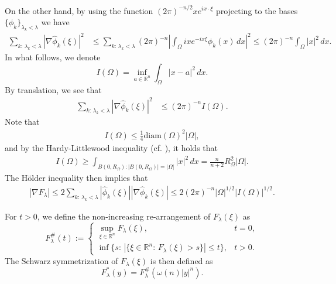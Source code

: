 \documentclass[11pt,twoside, leqno]{article}
\def\rr{{\mathbb R}}
\def\rn{{{\rr}^n}}
\numberwithin{equation}{section}
\begin{document}
On the other hand, by using  the function $(2\pi)^{-n/2} xe^{ix\cdot\xi}$ projecting to the bases $\{\phi_k\}_{\lambda_k<\lambda}$  we have
\begin{align}
\sum_{k:\,\lambda_k<\lambda} |\nabla\hat{\phi}_k(\xi)|^2&\le \sum_{k:\,\lambda_k<\lambda} (2\pi)^{-n}\left|\int_\Omega ixe^{-ix\xi}\phi_k(x)\,dx\right|^2\le (2\pi)^{-n}\int_\Omega|x|^2\,dx.
\end{align}
In what follows,
we denote
$$I(\Omega)=\inf_{a\in\rn}\int_\Omega|x-a|^2\,dx.$$
By translation, we see that
\begin{align}
\sum_{k:\,\lambda_k<\lambda} |\nabla\hat{\phi}_k(\xi)|^2&\le (2\pi)^{-n}I(\Omega).
\end{align}
Note that
\begin{align}
I(\Omega)\le \frac{1}{4} \mathrm{diam}(\Omega)^2 |\Omega|,
\end{align}
and by the Hardy-Littlewood inequality (cf. \cite[Corollary 1.4.1]{Kesa06}), it holds that
\begin{align}\label{hl-inequality}
I(\Omega)\ge \int_{B(0,R_\Omega):|B(0,R_\Omega)|=|\Omega|}|x|^2\,dx=\frac{n}{n+2}R_\Omega^2|\Omega|.
\end{align}
The H\"older inequality then implies that
\begin{align}\label{gradient-f}
|\nabla F_\lambda|\le 2 \sum_{k:\,\lambda_k<\lambda} |\hat{\phi}_k(\xi)||\nabla \hat{\phi}_k(\xi) |\le 2(2\pi)^{-n}|\Omega|^{1/2}|I(\Omega)|^{1/2}.
\end{align}

For $t>0$, we define the non-increasing re-arrangement of $F_\lambda(\xi)$ as
$$F_\lambda^\#(t):=
\begin{cases}
\sup_{\xi\in\rn}F_\lambda(\xi), & t=0,\\
\inf\{s:\,|\{\xi\in\rn:\,F_\lambda(\xi)>s\}|\le t\}, &t>0.
\end{cases}$$
The Schwarz symmetrization of  $F_\lambda(\xi)$ is then defined as
$$F_\lambda^\ast(y)=F_\lambda^\#(\omega(n)|y|^n).$$
\end{document}
